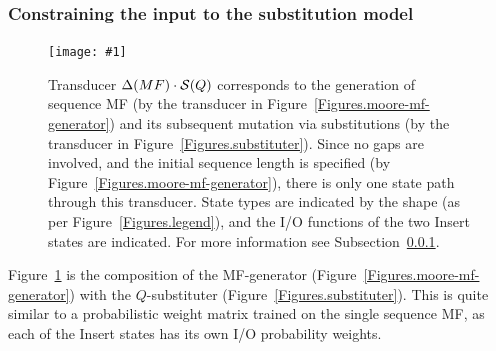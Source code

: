\documentclass{article}
\newcommand{\secref}[1]{Subsection~\ref{sec.#1}}
\newcommand{\seclabel}[1]{\label{sec.#1}}
\newcommand{\tabnum}[1]{\ref{tab.#1}}
\newcommand{\tabref}[1]{Table~\tabnum{#1}}
\newcommand{\tablabel}[1]{\label{tab.#1}}
\newcommand{\figref}[1]{Figure~\ref{Figures.#1}}
\newcommand{\figlabel}[1]{\label{Figures.#1}}
\newcommand{\easyfig}[4]{
\begin{figure}
\texttt{[image: \#1]}
\caption{ \figlabel{#3} #4}
\end{figure}}
\newcommand{\widepdffig}[2]{\easyfig{#1-fig.pdf}{width=\textwidth}{#1}{#2}}
\newcommand\substitute{{\cal S}}
\newcommand\generate{\Delta}
\begin{document}
\subsubsection{Constraining the input to the substitution model}
\seclabel{mf-substituter}
\widepdffig{mf-substituter}{Transducer $\generate(MF) \cdot \substitute(Q)$
corresponds to the generation of sequence MF (by the transducer in \figref{moore-mf-generator})
and its subsequent mutation via substitutions (by the transducer in \figref{substituter}).
Since no gaps are involved, and the initial sequence length is specified (by \figref{moore-mf-generator}),
there is only one state path through this transducer.
State types are indicated by the shape (as per \figref{legend}), and the I/O functions of the two Insert states are indicated.
For more information see
\secref{mf-substituter}.
}

\figref{mf-substituter} is the composition of the MF-generator (\figref{moore-mf-generator}) with the $Q$-substituter (\figref{substituter}). 
This is quite similar to a probabilistic weight matrix trained on the single sequence MF,
as each of the Insert states has its own I/O probability weights.

% 
\end{document}
